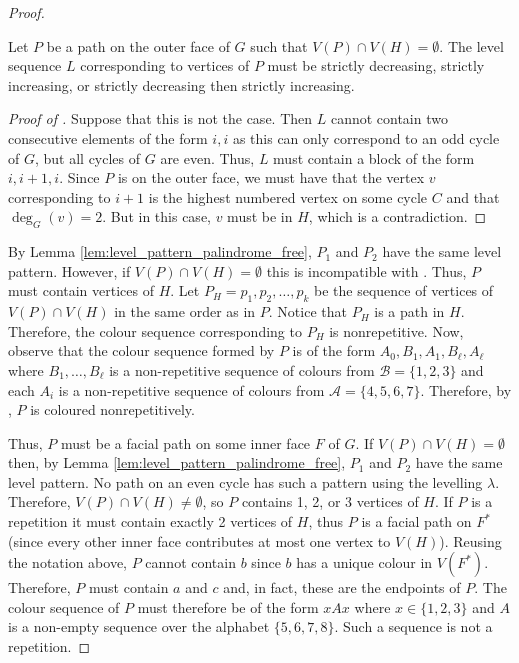 \documentclass{cccg16}
\begin{document}
\begin{proof}
 \begin{clm}
    Let $P$ be a path on the outer face of $G$ such that $V(P) \cap V(H)
    = \emptyset$. The level sequence $L$ corresponding to vertices of
    $P$ must be strictly decreasing, strictly increasing, or strictly
    decreasing then strictly increasing.
 \end{clm}
 \begin{proof}[Proof of ]
   Suppose that this is not the case. Then $L$ cannot contain two
   consecutive elements of the form $i,i$ as this can only correspond
   to an odd cycle of $G$, but all cycles of $G$ are even. Thus, $L$
   must contain a block of the form $i,i+1,i$. Since $P$ is on the outer
   face, we must have that the vertex $v$ corresponding to $i+1$ is the
   highest numbered vertex on some cycle $C$ and that $\deg_G(v)=2$. But
   in this case, $v$ must be in $H$, which is a contradiction.
 \end{proof}
 By Lemma \ref{lem:level_pattern_palindrome_free}, $P_1$ and $P_2$ have
 the same level pattern. However, if $V(P) \cap V(H) = \emptyset$ this
 is incompatible with .  Thus, $P$ must contain
 vertices of $H$. Let $P_H=p_1,p_2,\ldots,p_k$ be the sequence of vertices
 of $V(P) \cap V(H)$ in the same order as in $P$. Notice that $P_H$ is
 a path in $H$.  Therefore, the colour sequence corresponding to $P_H$
 is nonrepetitive.  Now, observe that the colour sequence formed by $P$
 is of the form $A_0,B_1,A_1,B_\ell,A_\ell$ where $B_1,\ldots,B_\ell$
 is a non-repetitive sequence of colours from $\mathcal{B}=\{1,2,3\}$ and
 each $A_i$ is a non-repetitive sequence of colours from $\mathcal{A}=\{4,5,6,7\}$.
 Therefore, by , $P$ is coloured nonrepetitively.

Thus, $P$ must be a facial path on some inner face $F$ of $G$.  If $V(P) \cap V(H) =
\emptyset$ then, by Lemma \ref{lem:level_pattern_palindrome_free},
$P_1$ and $P_2$ have the same level pattern.  No path on an even cycle
has such a pattern using the levelling $\lambda$.
Therefore, $V(P)\cap V(H)\neq\emptyset$, so $P$ contains 1, 2, or
3 vertices of $H$.  If $P$ is a repetition it must contain exactly
2 vertices of $H$, thus $P$ is a facial path on $F^*$ (since every
other inner face contributes at most one vertex to $V(H)$).  Reusing the
notation above, $P$ cannot contain $b$ since $b$ has a unique colour in
$V(F^*)$. Therefore, $P$ must contain $a$ and $c$ and, in fact, these are
the endpoints of $P$.  The colour sequence of $P$ must therefore be of
the form $xAx$ where $x\in\{1,2,3\}$ and $A$ is a non-empty sequence over
the alphabet $\{5,6,7,8\}$.  Such a sequence is not a repetition.
\end{proof}
\end{document}
